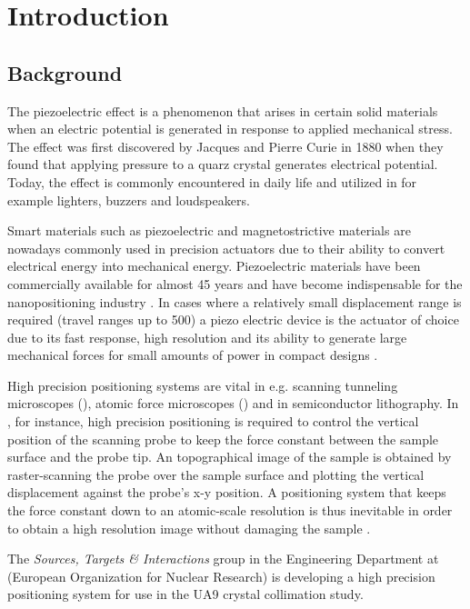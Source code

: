 \chapter{Introduction}\label{cha:intro}

\section{Background}
The piezoelectric effect is a phenomenon that arises in certain solid materials when an electric potential is generated in response to applied mechanical stress. The effect was first discovered by Jacques and Pierre Curie in 1880 when they found that applying pressure to a quarz crystal generates electrical potential. Today, the effect is commonly encountered in daily life and utilized in for example lighters, buzzers and loudspeakers.

Smart materials such as piezoelectric and magnetostrictive materials are nowadays commonly used in precision actuators due to their ability to convert electrical energy into mechanical energy. Piezoelectric materials have been commercially available for almost 45 years and have become indispensable for the nanopositioning industry \citep{Piezo:2008}. In cases where a relatively small displacement range is required (travel ranges up to \unit{500}{\micro\meter}) a piezo electric device is the actuator of choice due to its fast response, high resolution and its ability to generate large mechanical forces for small amounts of power in compact designs \citep{SurveyOfControlIssues:2007}.

High precision positioning systems are vital in e.g. scanning tunneling microscopes (\abbrSTM), atomic force microscopes (\abbrAFM) and in semiconductor lithography. In \abbrAFM, for instance, high precision positioning is required to control the vertical position of the scanning probe to keep the force constant between the sample surface and the probe tip. An topographical image of the sample is obtained by raster-scanning the probe over the sample surface and plotting the vertical displacement against the probe's x-y position. A positioning system that keeps the force constant down to an atomic-scale resolution is thus inevitable in order to obtain a high resolution image without damaging the sample \citep{SurveyOfControlIssues:2007}.

The \emph{Sources, Targets & Interactions} group in the Engineering Department at \abbrCERN (European Organization for Nuclear Research) is developing a high precision positioning system for use in the UA9 crystal collimation study.

